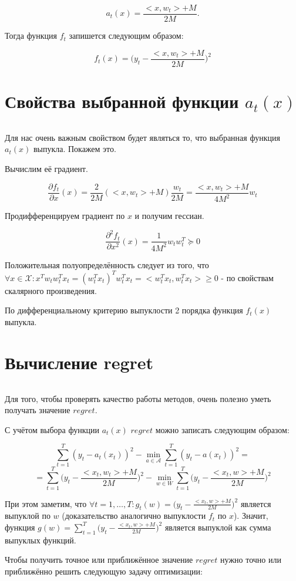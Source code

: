 \documentclass[12pt]{article}
\theoremstyle{definition}
\begin{document}
 $$a_t(x) = \frac{<x, w_t>+M}{2M}.$$
 
 Тогда функция $f_t$ запишется следующим образом:
 
 $$f_t(x) = \bigg(y_t - \frac{<x, w_t>+M}{2M}\bigg)^2$$
 
\section*{Свойства выбранной функции $a_t(x)$}
$ $

Для нас очень важным свойством будет являться то, что выбранная функция $a_t(x)$ выпукла. Покажем это.

Вычислим её градиент.

$$\frac{\partial f_t}{\partial x}(x) = \frac{2}{2M}(<x, w_t>+M)\frac{w_t}{2M} = \frac{<x, w_t>+M}{4M^2}w_t$$

Продифференцируем градиент по $x$ и получим гессиан.

$$\frac{\partial^2 f_t}{\partial x^2}(x) = \frac{1}{4M^2}w_tw_t^T \succeq 0$$

Положительная полуопределённость следует из того, что $\forall x \in \mathcal{X}: x^Tw_tw_t^Tx_t = (w_t^Tx_t)^Tw_t^Tx_t = <w_t^Tx_t, w_t^Tx_t> \geq 0$ - по свойствам скалярного произведения.

По дифференциальному критерию выпуклости 2 порядка функция $f_t(x)$ выпукла. 

\section*{Вычисление regret}
$ $

Для того, чтобы проверять качество работы методов, очень полезно уметь получать значение $regret$.

С учётом выбора функции $a_t(x)$ $regret$ можно записать следующим образом:

$$\sum\limits_{t=1}^T (y_t-a_t(x_t))^2 - \min\limits_{a \in \mathcal{A}} \sum\limits_{t=1}^T (y_t-a(x_t))^2 =$$
$$= \sum\limits_{t=1}^T\bigg(y_t - \frac{<x_t, w_t>+M}{2M}\bigg)^2 - \min\limits_{w \in W}\sum\limits_{t=1}^T\bigg(y_t - \frac{<x_t, w>+M}{2M}\bigg)^2$$

При этом заметим, что $\forall t=1, \dots, T: g_t(w) = \bigg(y_t - \frac{<x_t, w>+M}{2M}\bigg)^2$ является выпуклой по $w$ (доказательство аналогично выпуклости $f_t$ по $x$).
Значит, функция $g(w) = \sum\limits_{t=1}^T\bigg(y_t - \frac{<x_t, w>+M}{2M}\bigg)^2$ является выпуклой как сумма выпуклых функций.

Чтобы получить точное или приближённое значение $regret$ нужно точно или приближённо решить следующую задачу оптимизации:
\end{document}
